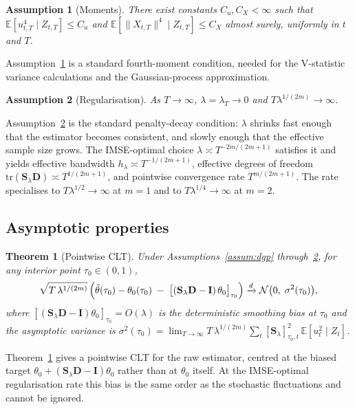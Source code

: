 \documentclass[12pt]{article}
\newcommand{\E}{\mathbb{E}}
\newcommand{\tr}{\mathrm{tr}}
\newcommand{\bfS}{\mathbf{S}}
\newcommand{\bfD}{\mathbf{D}}
\newcommand{\bfI}{\mathbf{I}}
\newtheorem{theorem}{Theorem}
\newtheorem{assumption}{Assumption}
\begin{document}
\begin{assumption}[Moments]\label{assum:moments}
There exist constants $C_u, C_X < \infty$ such that $\E[u_{t,T}^4 \mid Z_{t,T}] \leq C_u$ and $\E[\|X_{t,T}\|^4 \mid Z_{t,T}] \leq C_X$ almost surely, uniformly in $t$ and $T$.
\end{assumption}
Assumption~\ref{assum:moments} is a standard fourth-moment condition, needed for the V-statistic variance calculations and the Gaussian-process approximation.

\begin{assumption}[Regularisation]\label{assum:reg}
As $T \to \infty$, $\lambda = \lambda_T \to 0$ and $T \lambda^{1/(2m)} \to \infty$.
\end{assumption}
Assumption~\ref{assum:reg} is the standard penalty-decay condition: $\lambda$ shrinks fast enough that the estimator becomes consistent, and slowly enough that the effective sample size grows. The IMSE-optimal choice $\lambda \asymp T^{-2m/(2m+1)}$ satisfies it and yields effective bandwidth $h_\lambda \asymp T^{-1/(2m+1)}$, effective degrees of freedom $\tr(\bfS_\lambda \bfD) \asymp T^{1/(2m+1)}$, and pointwise convergence rate $T^{m/(2m+1)}$. The rate specialises to $T\lambda^{1/2} \to \infty$ at $m = 1$ and to $T\lambda^{1/4} \to \infty$ at $m = 2$.

\subsection{Asymptotic properties}\label{sec:inference-asymp}

\begin{theorem}[Pointwise CLT]\label{thm:clt}
Under Assumptions~\ref{assum:dgp} through~\ref{assum:reg}, for any interior point $\tau_0 \in (0,1)$,
\begin{equation}\label{eq:clt}
  \sqrt{T\, \lambda^{1/(2m)}}\,\Bigl(\hat\theta(\tau_0) - \theta_0(\tau_0) \;-\; \bigl[(\bfS_\lambda \bfD - \bfI)\, \theta_0\bigr]_{\tau_0}\Bigr) \xrightarrow{d} \mathcal{N}\bigl(0,\; \sigma^2(\tau_0)\bigr),
\end{equation}
where $[(\bfS_\lambda \bfD - \bfI)\theta_0]_{\tau_0} = O(\lambda)$ is the deterministic smoothing bias at $\tau_0$ and the asymptotic variance is $\sigma^2(\tau_0) = \lim_{T \to \infty} T\, \lambda^{1/(2m)} \sum_t [\bfS_\lambda]_{\tau_0, t}^2\, \E[u_t^2 \mid Z_t]$.
\end{theorem}
Theorem~\ref{thm:clt} gives a pointwise CLT for the raw estimator, centred at the biased target $\theta_0 + (\bfS_\lambda\bfD - \bfI)\theta_0$ rather than at $\theta_0$ itself. At the IMSE-optimal regularisation rate this bias is the same order as the stochastic fluctuations and cannot be ignored.
\end{document}
